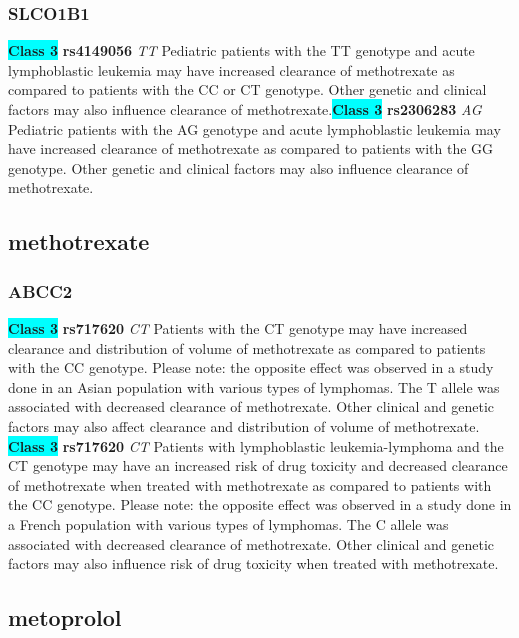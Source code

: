 \documentclass{book}
\begin{document}
\subsubsection{ SLCO1B1 }

\begin{center}
\textbf{\colorbox{cyan} {Class 3}} \textbf{ rs4149056 } \textit{ TT }
Pediatric patients with the TT genotype and acute lymphoblastic leukemia may have increased clearance of methotrexate as compared to patients with the CC or CT genotype. Other genetic and clinical factors may also influence clearance of methotrexate.\textbf{\colorbox{cyan} {Class 3}} \textbf{ rs2306283 } \textit{ AG }
Pediatric patients with the AG genotype and acute lymphoblastic leukemia may have increased clearance of methotrexate as compared to patients with the GG genotype. Other genetic and clinical factors may also influence clearance of methotrexate. 


\end{center}\subsection{ methotrexate }


\subsubsection{ ABCC2 }

\begin{center}
\textbf{\colorbox{cyan} {Class 3}} \textbf{ rs717620 } \textit{ CT }
Patients with the CT genotype may have increased clearance and distribution of volume of methotrexate as compared to patients with the CC genotype. Please note: the opposite effect was observed in a study done in an Asian population with various types of lymphomas. The T allele was associated with decreased clearance of methotrexate. Other clinical and genetic factors may also affect clearance and distribution of volume of methotrexate. \textbf{\colorbox{cyan} {Class 3}} \textbf{ rs717620 } \textit{ CT }
Patients with lymphoblastic leukemia-lymphoma and the CT genotype may have an increased risk of drug toxicity and decreased clearance of methotrexate when treated with methotrexate as compared to patients with the CC genotype. Please note: the opposite effect was observed in a study done in a French population with various types of lymphomas. The C allele was associated with decreased clearance of methotrexate. Other clinical and genetic factors may also influence risk of drug toxicity when treated with methotrexate. 


\end{center}\subsection{ metoprolol }
\end{document}
